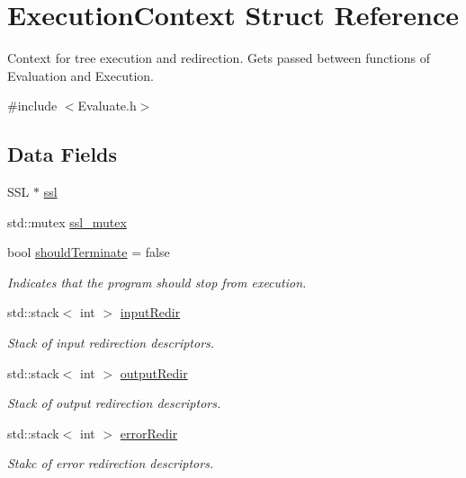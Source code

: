 \hypertarget{structExecutionContext}{}\section{Execution\+Context Struct Reference}
\label{structExecutionContext}


Context for tree execution and redirection. Gets passed between functions of Evaluation and Execution.  




{\ttfamily \#include $<$Evaluate.\+h$>$}

\subsection*{Data Fields}
\begin{DoxyCompactItemize}
\item 
S\+SL $\ast$ \hyperlink{structExecutionContext_afce3bfa5f05214b9b0d57ac1edb0a0f4}{ssl}
\item 
std\+::mutex \hyperlink{structExecutionContext_a241cad372197f9880a9af9e93ecd7633}{ssl\+\_\+mutex}
\item 
bool \hyperlink{structExecutionContext_a3b3a2c509c6c08190a8ee67e39dd80cf}{should\+Terminate} = false
\begin{DoxyCompactList}\small\item\em Indicates that the program should stop from execution. \end{DoxyCompactList}\item 
std\+::stack$<$ int $>$ \hyperlink{structExecutionContext_a33562118feda5571fe0ba87186670679}{input\+Redir}
\begin{DoxyCompactList}\small\item\em Stack of input redirection descriptors. \end{DoxyCompactList}\item 
std\+::stack$<$ int $>$ \hyperlink{structExecutionContext_a15af12d7e8146ae1a5f091b7d9919c8c}{output\+Redir}
\begin{DoxyCompactList}\small\item\em Stack of output redirection descriptors. \end{DoxyCompactList}\item 
std\+::stack$<$ int $>$ \hyperlink{structExecutionContext_aa5d29389a31755f8a0c1099f7c7768bf}{error\+Redir}
\begin{DoxyCompactList}\small\item\em Stakc of error redirection descriptors. \end{DoxyCompactList}\item 

\end{DoxyCompactItemize}
